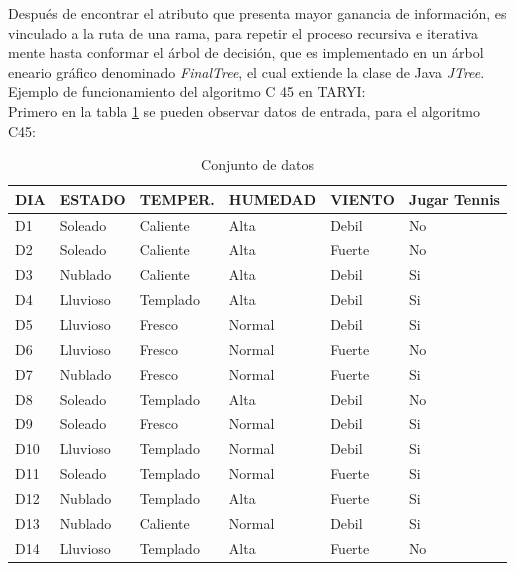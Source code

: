 Despu\'es de encontrar el atributo que presenta mayor ganancia de informaci\'on, es vinculado a la ruta de una
rama, para repetir el proceso recursiva e iterativa mente hasta conformar el \'arbol de decisi\'on, que es
implementado en un \'arbol eneario gr\'afico denominado \textit{FinalTree}, el cual extiende la clase de Java 
\textit{JTree}.\\

Ejemplo de funcionamiento del algoritmo C 45 en TARYI:\\

Primero en la tabla \ref{tabc451} se pueden observar datos de entrada, para el algoritmo C45:\\

\begin{table}[!t]
\begin{center}
\begin{tabular}{|l|l|l|l|l|l|}\hline
DIA & ESTADO & TEMPER. & HUMEDAD & VIENTO & Jugar Tennis \\ \hline
D1 & Soleado & Caliente & Alta & Debil & No \\ \hline
D2 & Soleado & Caliente & Alta & Fuerte & No \\ \hline
D3 & Nublado & Caliente & Alta & Debil & Si \\ \hline
D4 & Lluvioso & Templado & Alta & Debil & Si \\ \hline
D5 & Lluvioso & Fresco & Normal & Debil & Si \\ \hline
D6 & Lluvioso & Fresco & Normal & Fuerte & No \\ \hline
D7 & Nublado & Fresco & Normal & Fuerte & Si \\ \hline
D8 & Soleado & Templado & Alta & Debil & No \\ \hline
D9 & Soleado & Fresco & Normal & Debil & Si \\ \hline
D10 & Lluvioso & Templado & Normal & Debil & Si \\ \hline
D11 & Soleado & Templado & Normal & Fuerte & Si \\ \hline
D12 & Nublado & Templado & Alta & Fuerte & Si \\ \hline
D13 & Nublado & Caliente & Normal & Debil & Si \\ \hline
D14 & Lluvioso & Templado & Alta & Fuerte & No \\ \hline
\end{tabular}
\end{center}
\caption{Conjunto de datos}
\label{tabc451}
\end{table}

